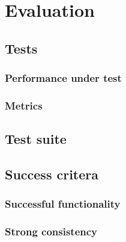 \chapter{Evaluation}

\section{Tests}

\subsection{Performance under test}

\subsection{Metrics}

\section{Test suite}

\section{Success critera}

\subsection{Successful functionality}

\subsection{Strong consistency}
